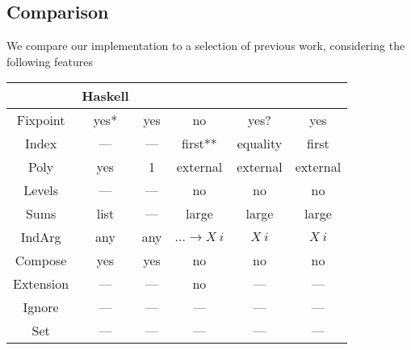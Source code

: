 



\subsection{Comparison}
We compare our implementation to a selection of previous work, considering the following features


\begin{tabular}{c | c c c c c}
             & Haskell        & \cite{initenough} & \cite{levitation} & \cite{algorn} & \cite{progorn} \\
    \hline                                                                                             
    Fixpoint & yes*           & yes               & no                & yes?          & yes            \\
    Index    & —              & —                 & first**           & equality      & first          \\
    Poly     & yes            & 1                 & external          & external      & external       \\
    Levels   & —              & —                 & no                & no            & no             \\
    Sums     & list           & —                 & large             & large         & large          \\
    IndArg   & any            & any               & $\dots \to X\ i$  & $X\ i$        & $X\ i$         \\
    Compose  & yes            & yes               & no                & no            & no             \\
    Extension& —              & —                 & no                & —             & —              \\
    Ignore   & —              & —                 & —                 & —             & —              \\
    Set      & —              & —                 & —                 & —             & —              \\
\end{tabular}


